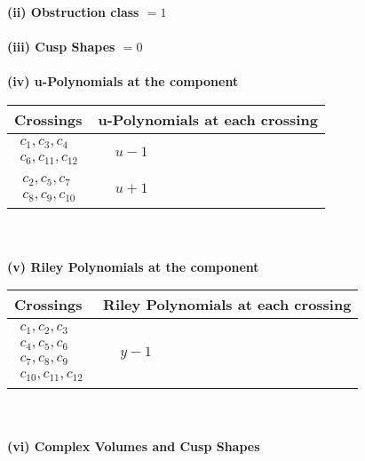 \documentclass[1p]{elsarticle_modified}
\theoremstyle{definition}
\begin{document}
\flushleft \textbf{(ii) Obstruction class $= 1$}\\~\\
\flushleft \textbf{(iii) Cusp Shapes $= 0$}\\~\\
\newpage\renewcommand{\arraystretch}{1}
\flushleft \textbf{(iv) u-Polynomials at the component}\newline \\
\begin{tabular}{m{50pt}|m{274pt}}
Crossings & \hspace{64pt}u-Polynomials at each crossing \\
\hline $$\begin{aligned}c_{1},c_{3},c_{4}\\c_{6},c_{11},c_{12}\end{aligned}$$&$\begin{aligned}
&u-1
\end{aligned}$\\
\hline $$\begin{aligned}c_{2},c_{5},c_{7}\\c_{8},c_{9},c_{10}\end{aligned}$$&$\begin{aligned}
&u+1
\end{aligned}$\\
\hline
\end{tabular}\\~\\
\newpage\renewcommand{\arraystretch}{1}
\flushleft \textbf{(v) Riley Polynomials at the component}\newline \\
\begin{tabular}{m{50pt}|m{274pt}}
Crossings & \hspace{64pt}Riley Polynomials at each crossing \\
\hline $$\begin{aligned}c_{1},c_{2},c_{3}\\c_{4},c_{5},c_{6}\\c_{7},c_{8},c_{9}\\c_{10},c_{11},c_{12}\end{aligned}$$&$\begin{aligned}
&y-1
\end{aligned}$\\
\hline
\end{tabular}\\~\\
\newpage\flushleft \textbf{(vi) Complex Volumes and Cusp Shapes}
\end{document}
